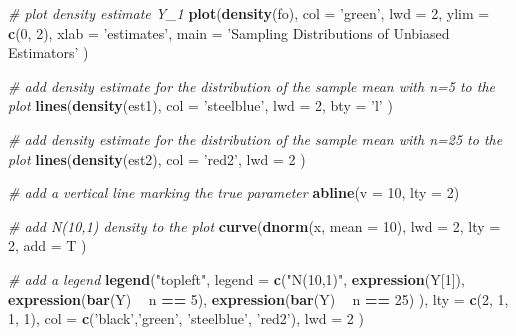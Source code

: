 \documentclass[]{book}
\newenvironment{Shaded}{\begin{snugshade}}{\end{snugshade}}
\newcommand{\KeywordTok}[1]{\textcolor[rgb]{0.13,0.29,0.53}{\textbf{#1}}}
\newcommand{\DataTypeTok}[1]{\textcolor[rgb]{0.13,0.29,0.53}{#1}}
\newcommand{\DecValTok}[1]{\textcolor[rgb]{0.00,0.00,0.81}{#1}}
\newcommand{\StringTok}[1]{\textcolor[rgb]{0.31,0.60,0.02}{#1}}
\newcommand{\CommentTok}[1]{\textcolor[rgb]{0.56,0.35,0.01}{\textit{#1}}}
\newcommand{\OperatorTok}[1]{\textcolor[rgb]{0.81,0.36,0.00}{\textbf{#1}}}
\newcommand{\NormalTok}[1]{#1}
\theoremstyle{definition}
\theoremstyle{definition}
\theoremstyle{definition}
\theoremstyle{remark}
\begin{document}
\begin{Shaded}
\begin{Highlighting}[]
\CommentTok{# plot density estimate Y_1}
\KeywordTok{plot}\NormalTok{(}\KeywordTok{density}\NormalTok{(fo), }
      \DataTypeTok{col =} \StringTok{'green'}\NormalTok{, }
      \DataTypeTok{lwd =} \DecValTok{2}\NormalTok{,}
      \DataTypeTok{ylim =} \KeywordTok{c}\NormalTok{(}\DecValTok{0}\NormalTok{, }\DecValTok{2}\NormalTok{),}
      \DataTypeTok{xlab =} \StringTok{'estimates'}\NormalTok{,}
      \DataTypeTok{main =} \StringTok{'Sampling Distributions of Unbiased Estimators'}
\NormalTok{      )}

\CommentTok{# add density estimate for the distribution of the sample mean with n=5 to the plot}
\KeywordTok{lines}\NormalTok{(}\KeywordTok{density}\NormalTok{(est1), }
     \DataTypeTok{col =} \StringTok{'steelblue'}\NormalTok{, }
     \DataTypeTok{lwd =} \DecValTok{2}\NormalTok{, }
     \DataTypeTok{bty =} \StringTok{'l'}
\NormalTok{     )}

\CommentTok{# add density estimate for the distribution of the sample mean with n=25 to the plot}
\KeywordTok{lines}\NormalTok{(}\KeywordTok{density}\NormalTok{(est2), }
      \DataTypeTok{col =} \StringTok{'red2'}\NormalTok{, }
      \DataTypeTok{lwd =} \DecValTok{2}
\NormalTok{      )}

\CommentTok{# add a vertical line marking the true parameter}
\KeywordTok{abline}\NormalTok{(}\DataTypeTok{v =} \DecValTok{10}\NormalTok{, }\DataTypeTok{lty =} \DecValTok{2}\NormalTok{)}

\CommentTok{# add N(10,1) density to the plot}
\KeywordTok{curve}\NormalTok{(}\KeywordTok{dnorm}\NormalTok{(x, }\DataTypeTok{mean =} \DecValTok{10}\NormalTok{), }
     \DataTypeTok{lwd =} \DecValTok{2}\NormalTok{,}
     \DataTypeTok{lty =} \DecValTok{2}\NormalTok{,}
     \DataTypeTok{add =}\NormalTok{ T}
\NormalTok{     )}

\CommentTok{# add a legend}
\KeywordTok{legend}\NormalTok{(}\StringTok{"topleft"}\NormalTok{,}
       \DataTypeTok{legend =} \KeywordTok{c}\NormalTok{(}\StringTok{"N(10,1)"}\NormalTok{,}
                  \KeywordTok{expression}\NormalTok{(Y[}\DecValTok{1}\NormalTok{]),}
                  \KeywordTok{expression}\NormalTok{(}\KeywordTok{bar}\NormalTok{(Y) }\OperatorTok{~}\StringTok{ }\NormalTok{n }\OperatorTok{==}\StringTok{ }\DecValTok{5}\NormalTok{),}
                  \KeywordTok{expression}\NormalTok{(}\KeywordTok{bar}\NormalTok{(Y) }\OperatorTok{~}\StringTok{ }\NormalTok{n }\OperatorTok{==}\StringTok{ }\DecValTok{25}\NormalTok{)}
\NormalTok{                  ), }
       \DataTypeTok{lty =} \KeywordTok{c}\NormalTok{(}\DecValTok{2}\NormalTok{, }\DecValTok{1}\NormalTok{, }\DecValTok{1}\NormalTok{, }\DecValTok{1}\NormalTok{), }
       \DataTypeTok{col =} \KeywordTok{c}\NormalTok{(}\StringTok{'black'}\NormalTok{,}\StringTok{'green'}\NormalTok{, }\StringTok{'steelblue'}\NormalTok{, }\StringTok{'red2'}\NormalTok{),}
       \DataTypeTok{lwd =} \DecValTok{2}
\NormalTok{       )}
\end{Highlighting}
\end{Shaded}
\end{document}
